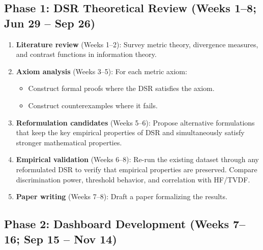 \documentclass[11pt]{article}
\begin{document}
\subsection{Phase 1: DSR Theoretical Review (Weeks 1--8; Jun 29 -- Sep 26)}

\begin{enumerate}
  \item \textbf{Literature review} (Weeks 1--2): Survey metric theory, divergence measures, and contrast functions in information theory.

  \item \textbf{Axiom analysis} (Weeks 3--5): For each metric axiom:
  \begin{itemize}
    \item Construct formal proofs where the DSR satisfies the axiom.
    \item Construct counterexamples where it fails.
  \end{itemize}

  \item \textbf{Reformulation candidates} (Weeks 5--6): Propose alternative formulations that keep the key empirical properties of DSR and simultaneously satisfy stronger mathematical properties.
  
  \item \textbf{Empirical validation} (Weeks 6--8): Re-run the existing dataset through any reformulated DSR to verify that empirical properties are preserved. Compare discrimination power, threshold behavior, and correlation with HF/TVDF.

  \item \textbf{Paper writing} (Weeks 7--8): Draft a paper formalizing the results.
\end{enumerate}

\subsection{Phase 2: Dashboard Development (Weeks 7--16; Sep 15 -- Nov 14)}
\end{document}
